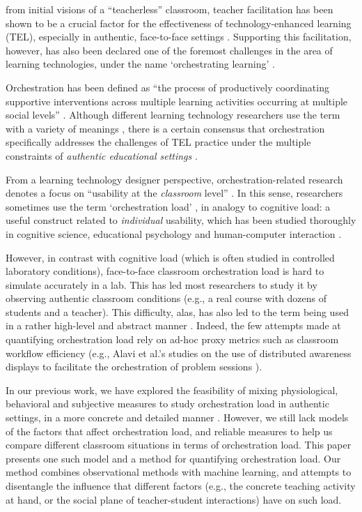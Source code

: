 \documentclass[10pt,journal,compsoc]{IEEEtran}
\begin{document}

 from initial visions of a ``teacherless'' classroom, teacher facilitation has been shown to be a crucial factor for the effectiveness of technology-enhanced learning (TEL), especially in authentic, face-to-face settings \cite{Gomez2013,Onrubia2012}. Supporting this facilitation, however, has also been declared one of the foremost challenges in the area of learning technologies, under the name `orchestrating learning' \cite{STELLARorch}. 

Orchestration has been defined as ``the process of productively coordinating supportive interventions across multiple learning activities occurring at multiple social levels'' \cite{Dillenbourg2009}. Although different learning technology researchers use the term with a variety of meanings \cite{Prieto2011}, there is a certain consensus that orchestration specifically addresses the challenges of TEL practice under the multiple constraints of \textit{authentic educational settings} \cite{Roschelle2013}.

From a learning technology designer perspective, orchestration-related research denotes a focus on ``usability at the \textit{classroom} level'' \cite{Dillenbourg2011}. In this sense, researchers sometimes use the term `orchestration load' \cite{Dillenbourg2013,Cuendet2013,munoz2013sharing}, in analogy to cognitive load: a useful construct related to \textit{individual} usability, which has been studied thoroughly in cognitive science, educational psychology and human-computer interaction \cite{sweller1994cognitive,oviatt2006human}.

However, in contrast with cognitive load (which is often studied in controlled laboratory conditions), face-to-face classroom orchestration load is hard to simulate accurately in a lab. This has led most researchers to study it by observing authentic classroom conditions (e.g., a real course with dozens of students and a teacher). This difficulty, alas, has also led to the term being used in a rather high-level and abstract manner \cite{Dillenbourg2013,Cuendet2013}. Indeed, the few attempts made at quantifying orchestration load rely on ad-hoc proxy metrics such as classroom workflow efficiency (e.g., Alavi et al.'s studies on the use of distributed awareness displays to facilitate the orchestration of problem sessions \cite{Alavi2012}).

In our previous work, we have explored the feasibility of mixing physiological, behavioral and subjective measures to study orchestration load in authentic settings, in a more concrete and detailed manner \cite{Prieto2015ectel}. However, we still lack models of the factors that affect orchestration load, and reliable measures to help us compare different classroom situations in terms of orchestration load. This paper presents one such model and a method for quantifying orchestration load. Our method combines observational methods with machine learning, and attempts to disentangle the influence that different factors (e.g., the concrete teaching activity at hand, or the social plane of teacher-student interactions) have on such load.
\end{document}

